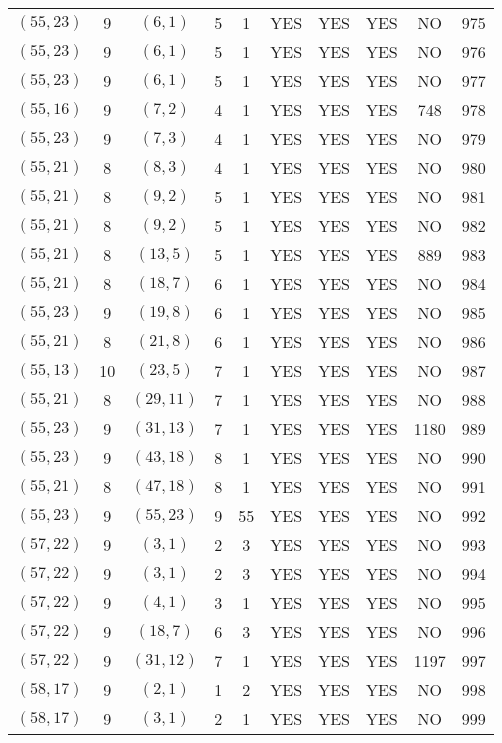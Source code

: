 \begin{longtable}{|c|c|c|c|c|c|c|c|c|c|}
$(55, 23)$ & 9 & $(6, 1)$ & 5 & 1 & YES & YES & YES & NO & 975\\
$(55, 23)$ & 9 & $(6, 1)$ & 5 & 1 & YES & YES & YES & NO & 976\\
$(55, 23)$ & 9 & $(6, 1)$ & 5 & 1 & YES & YES & YES & NO & 977\\
$(55, 16)$ & 9 & $(7, 2)$ & 4 & 1 & YES & YES & YES & 748 & 978\\
$(55, 23)$ & 9 & $(7, 3)$ & 4 & 1 & YES & YES & YES & NO & 979\\
$(55, 21)$ & 8 & $(8, 3)$ & 4 & 1 & YES & YES & YES & NO & 980\\
$(55, 21)$ & 8 & $(9, 2)$ & 5 & 1 & YES & YES & YES & NO & 981\\
$(55, 21)$ & 8 & $(9, 2)$ & 5 & 1 & YES & YES & YES & NO & 982\\
$(55, 21)$ & 8 & $(13, 5)$ & 5 & 1 & YES & YES & YES & 889 & 983\\
$(55, 21)$ & 8 & $(18, 7)$ & 6 & 1 & YES & YES & YES & NO & 984\\
$(55, 23)$ & 9 & $(19, 8)$ & 6 & 1 & YES & YES & YES & NO & 985\\
$(55, 21)$ & 8 & $(21, 8)$ & 6 & 1 & YES & YES & YES & NO & 986\\
$(55, 13)$ & 10 & $(23, 5)$ & 7 & 1 & YES & YES & YES & NO & 987\\
$(55, 21)$ & 8 & $(29, 11)$ & 7 & 1 & YES & YES & YES & NO & 988\\
$(55, 23)$ & 9 & $(31, 13)$ & 7 & 1 & YES & YES & YES & 1180 & 989\\
$(55, 23)$ & 9 & $(43, 18)$ & 8 & 1 & YES & YES & YES & NO & 990\\
$(55, 21)$ & 8 & $(47, 18)$ & 8 & 1 & YES & YES & YES & NO & 991\\
$(55, 23)$ & 9 & $(55, 23)$ & 9 & 55 & YES & YES & YES & NO & 992\\
$(57, 22)$ & 9 & $(3, 1)$ & 2 & 3 & YES & YES & YES & NO & 993\\
$(57, 22)$ & 9 & $(3, 1)$ & 2 & 3 & YES & YES & YES & NO & 994\\
$(57, 22)$ & 9 & $(4, 1)$ & 3 & 1 & YES & YES & YES & NO & 995\\
$(57, 22)$ & 9 & $(18, 7)$ & 6 & 3 & YES & YES & YES & NO & 996\\
$(57, 22)$ & 9 & $(31, 12)$ & 7 & 1 & YES & YES & YES & 1197 & 997\\
$(58, 17)$ & 9 & $(2, 1)$ & 1 & 2 & YES & YES & YES & NO & 998\\
$(58, 17)$ & 9 & $(3, 1)$ & 2 & 1 & YES & YES & YES & NO & 999\\

\end{longtable}
